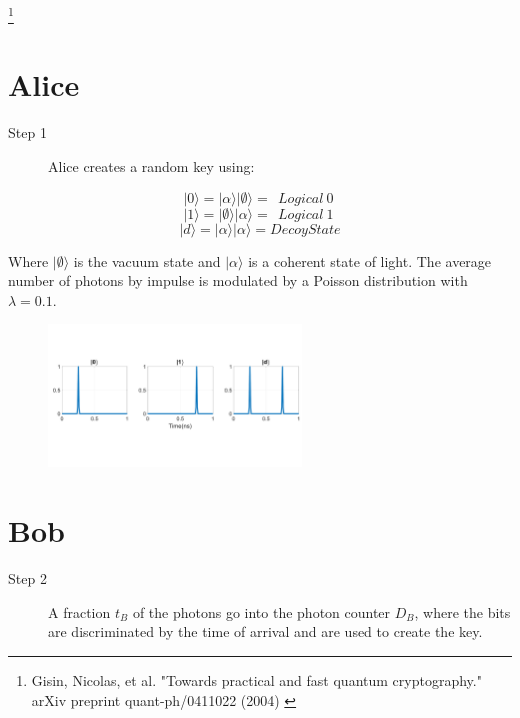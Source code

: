 \documentclass[1000pt]{article}
\newcommand{\mysection}[1]{\section*{\color{black}\sffamily #1}}%
\newcommand{\cref}[1]{{\fontsize{17pt}{0cm}\selectfont\color{black} #1}}%
\newcommand\blfootnote[1]{%
  \begingroup
  \renewcommand\thefootnote{}\footnote{#1}%
  \addtocounter{footnote}{-1}%
  \endgroup
}
\begin{document}
\blfootnote{
\hspace*{12cm}
\begin{minipage}{26cm}
\cref{
Gisin, Nicolas, et al. "Towards practical and fast quantum cryptography." arXiv preprint quant-ph/0411022 (2004)
}
\end{minipage}
}

\mysection{\Huge\textbf{Alice}} \Large \vspace*{1cm}

\begin{description}

\item[Step 1] Alice creates a random key using: 
 
\end{description}

$$|0\rangle = |\alpha\rangle |\emptyset\rangle =\ \ Logical\ 0\ $$
  $$|1\rangle = |\emptyset\rangle |\alpha\rangle =\ \ Logical\ 1\ $$
$$|d\rangle = |\alpha\rangle |\alpha\rangle = Decoy State$$

Where $|\emptyset\rangle$ is the vacuum state and $|\alpha\rangle$ is a coherent state of light. The average number of photons by impulse is modulated by a Poisson distribution with $\lambda=0.1$.

    \begin{figure}[hbt]
    	\centering
\includegraphics[width=0.6\textwidth]{./figures/S1.pdf}
        	\label{bob}
    \end{figure}





\mysection{\Huge\textbf{Bob}} \Large \vspace*{1cm}

\begin{description}
  \item[Step 2] A fraction $t_B$ of the photons go into the photon counter $D_B$, where the bits are discriminated by the time of arrival and are used to create the key.
\end{description}  
\end{document}
